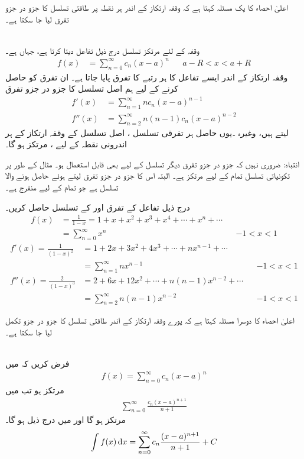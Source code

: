 اعلیٰ احصاء کا یک مسئلہ کہتا ہے کہ وقفہ ارتکاز کے اندر ہر نقطہ پر طاقتی تسلسل کا جزو در جزو تفرق لیا جا سکتا ہے۔

\\
وقفہ   کے لئے مرتکز تسلسل  درج ذیل تفاعل  دیتا کرتا ہے، جہاں  ہے۔
\begin{align*}
f(x)&=\sum_{n=0}^{\infty}c_n(x-a)^n&&a-R<x<a+R
\end{align*}
وقفہ ارتکاز کے اندر ایسے تفاعل کا ہر رتبے کا تفرق پایا جاتا ہے۔ ان تفرق کو حاصل کرنے کے لیے ہم اصل تسلسل کا جزو در جزو تفرق
\begin{align*}
f'(x)&=\sum_{n=1}^{\infty}nc_n(x-a)^{n-1}\\
f''(x)&=\sum_{n=2}^{\infty}n(n-1)c_n(x-a)^{n-2}
\end{align*}
لیتے ہیں، وغیرہ ۔یوں حاصل ہر   تفرقی تسلسل ، اصل تسلسل کے وقفہ ارتکاز کے ہر اندرونی نقطہ کے لیے  ، مرتکز ہو گا۔

انتباہ: ضروری نہیں کہ جزو در جزو تفرق دیگر تسلسل کے لیے بھی قابل استعمال ہو۔ مثال کے طور پر تکونیاتی تسلسل  تمام  کے لیے مرتکز ہے۔ البتہ اس کا جزو در جزو تفرق  لیتے ہوئے حاصل ہونے والا   تسلسل   ہے جو تمام  کے لیے منفرج ہے۔

درج ذیل تفاعل  کے تفرق  اور   کے تسلسل حاصل کریں۔
\begin{align*}
f(x)&=\frac{1}{1-x}=1+x+x^2+x^3+x^4+\cdots+x^n+\cdots\\
&=\sum_{n=0}^{\infty}x^n&&-1<x<1
\end{align*}
\begin{align*}
f'(x)=\frac{1}{(1-x)^2}&=1+2x+3x^2+4x^3+\cdots+nx^{n-1}+\cdots\\
&=\sum_{n=1}^{\infty}nx^{n-1}&&-1<x<1\\
f''(x)=\frac{2}{(1-x)^3}&=2+6x+12x^2+\cdots+n(n-1)x^{n-2}+\cdots\\
&=\sum_{n=2}^{\infty}n(n-1)x^{n-2}&&-1<x<1
\end{align*}

اعلیٰ احصاء کا دوسرا مسئلہ کہتا ہے کہ پورے وقفہ ارتکاز کے اندر  طاقتی تسلسل کا جزو در جزو تکمل لیا جا سکتا ہے۔

\\
فرض کریں کہ   میں 
\begin{align*}
f(x)=\sum_{n=0}^{\infty}c_n(x-a)^n
\end{align*}
مرتکز ہو تب  میں 
\begin{align*}
\sum_{n=0}^{\infty}\frac{c_n(x-a)^{n+1}}{n+1}
\end{align*}
مرتکز ہو گا  اور  میں درج ذیل ہو گا۔
\begin{align*}
\int f(x)\dif x=\sum_{n=0}^{\infty}c_n\frac{(x-a)^{n+1}}{n+1}+C
\end{align*}

